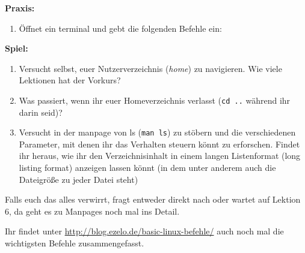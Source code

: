 \textbf{Praxis:}
\begin{enumerate}
    \item Öffnet ein \Gls{terminal} und gebt die folgenden Befehle ein:
\end{enumerate}

\textbf{Spiel:}
\begin{enumerate}
    \item Versucht selbst, euer Nutzerverzeichnis (\emph{home}) zu navigieren.
          Wie viele Lektionen hat der Vorkurs?
    \item Was passiert, wenn ihr euer Homeverzeichnis verlasst (\texttt{cd ..}
          während ihr darin seid)?
    \item Versucht in der manpage von ls (\texttt{man ls}) zu stöbern und die
          verschiedenen Parameter, mit denen ihr das Verhalten steuern könnt zu
          erforschen. Findet ihr heraus, wie ihr den Verzeichnisinhalt in einem
          langen Listenformat (long listing format) anzeigen lassen könnt (in dem
          unter anderem auch die Dateigröße zu jeder Datei steht)
\end{enumerate}

\vspace{5em}

Falls euch das alles verwirrt, fragt entweder direkt nach oder wartet auf
Lektion 6, da geht es zu Manpages noch mal ins Detail.

Ihr findet unter \url{http://blog.ezelo.de/basic-linux-befehle/} auch noch mal
die wichtigsten Befehle zusammengefasst.
